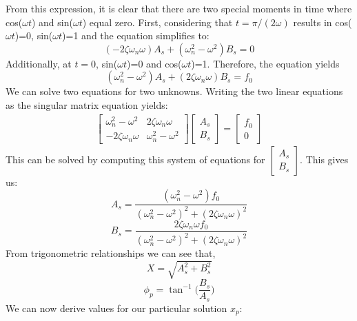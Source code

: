 \documentclass[12pt,letter]{article}
\begin{document}
	From this expression, it is clear that there are two special moments in time where cos($\omega t$) and sin($\omega t$) equal zero. First, considering that $t=\pi/(2\omega)$ results in cos($\omega t$)=0, sin($\omega t$)=1 and the equation simplifies to:
	\begin{equation}
		(-2\zeta \omega_n \omega)A_s + (\omega_n^2 - \omega^2)B_s = 0
	\end{equation}	
	Additionally, at $t=0$, sin($\omega t$)=0 and cos($\omega t$)=1. Therefore, the equation yields		
	\begin{equation}
		(\omega_n^2 - \omega^2)A_s + (2\zeta \omega_n \omega)B_s = f_0
	\end{equation}				
	We can solve two equations for two unknowns. Writing the two linear equations as the singular matrix equation yields:
	\begin{gather}
\begin{bmatrix}
\omega_n^2 - \omega^2 & 2\zeta \omega_n \omega \\
- 2\zeta \omega_n \omega &  \omega_n^2 - \omega^2
\end{bmatrix}
\begin{bmatrix}
A_s \\
B_s
\end{bmatrix}
= \begin{bmatrix} f_0 \\ 0
\end{bmatrix}
	\end{gather}
	This can be solved by computing this system of equations for $\begin{bmatrix}
		A_s \\
		B_s
	\end{bmatrix}$. This gives us:
	\begin{equation}
		A_s = \frac{(\omega_n^2 - \omega^2)f_0}{(\omega_n^2 - \omega^2)^2 +  (2\zeta \omega_n \omega)^2}
	\end{equation}	
	\begin{equation}
		B_s = \frac{2\zeta \omega_n \omega f_0}{(\omega_n^2 - \omega^2)^2 +  (2\zeta \omega_n \omega)^2}
	\end{equation}	
	From trigonometric relationships we can see that, 
	\begin{equation}
		X = \sqrt{A_s^2 + B_s^2}
	\end{equation}	
	\begin{equation}
		\phi_p = \tan^{-1}\bigg(\frac{B_s}{A_s}\bigg)
	\end{equation}	
	We can now derive values for our particular solution $x_p$:
\end{document}
